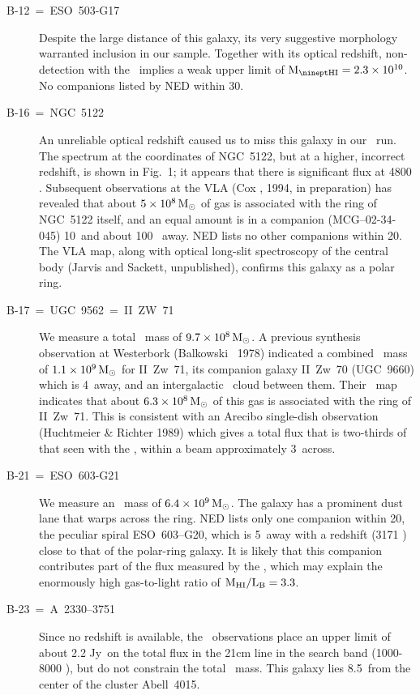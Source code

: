 \begin{description}
\item[B-12~=~ESO~503-G17]
Despite the large distance of this galaxy, its very suggestive morphology 
warranted inclusion in our sample.  Together with its optical redshift, 
non-detection with the \ 
implies a weak upper limit of $\mhi = 2.3 \times 10^{10}$.  
No companions listed by NED within 30\AMIN.

\item[B-16~=~NGC~5122] 
An unreliable optical redshift caused us to miss this galaxy in our 
\GB140\ run. The spectrum at the coordinates of NGC~5122, but 
at a higher, incorrect redshift, is shown in Fig.~1;  
it appears that there is significant flux at 4800 \KMS.   
Subsequent observations at the VLA (Cox \etal, 1994, in preparation) 
has revealed that 
about $5 \times 10^8 {\,{\rm M}_\odot}$ of gas is associated with the ring of 
NGC~5122 itself, and an equal amount is in a companion (MCG--02-34-045) 
10\AMIN\ and about 100 \KMS\ away.  
NED lists no other companions within 20\AMIN.  The VLA map, along with
optical long-slit spectroscopy of the central body (Jarvis and Sackett,
unpublished), confirms this galaxy as a polar ring. 

\item[B-17~=~UGC~9562~=~II~ZW~71] 
We measure a total \HI\ mass of $9.7 \times 10^8 {\,{\rm M}_\odot}$.
A previous synthesis observation at Westerbork (Balkowski \etal\ 1978) 
indicated a combined \HI\ mass of $1.1 \times 10^9 {\,{\rm M}_\odot}$ for II~Zw~71,
its companion galaxy II~Zw~70 (UGC~9660) which is 4\AMIN\ away, 
and an intergalactic \HI\ cloud between them.  
Their \HI\ map indicates that about 
$6.3 \times 10^8 {\,{\rm M}_\odot}$ of this gas is associated with the ring of II~Zw~71. 
This is consistent with an Arecibo single-dish observation 
(\cf Huchtmeier \& Richter 1989) which gives a 
total flux that is two-thirds of that seen with the , 
within a beam approximately 3\AMIN\ across.

\item[B-21~=~ESO~603-G21] 
We measure an \HI\ mass of $6.4 \times 10^9 {\,{\rm M}_\odot}$. 
The galaxy has a prominent dust lane that warps across the ring. 
NED lists only one companion within 20\AMIN, the peculiar spiral 
ESO~603--G20, which is 5\AMIN\ away with a redshift (3171 \KMS) close to
that of the polar-ring galaxy.  It is likely that this companion
contributes part of the flux measured by the \GB140, which may explain
the enormously high gas-to-light ratio of $\rm M_{\rm
HI}/L_{\rm B} = 3.3$. 

\item[B-23~=~A~2330--3751]
Since no redshift is available, the \ observations place an upper limit 
of about 2.2 Jy\CDOT\KMS\ on the total flux in the 21cm line 
in the search band (1000-8000 \KMS), but do not constrain the total \HI\ mass.  
This galaxy lies 8.5\AMIN\ from the center of the cluster Abell~4015.    


\end{description}
